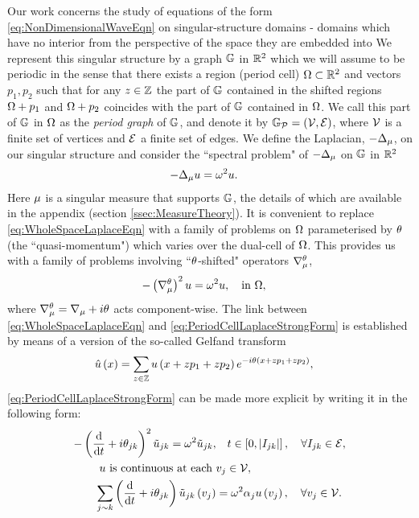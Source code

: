 Our work concerns the study of equations of the form \eqref{eq:NonDimensionalWaveEqn} on singular-structure domains - domains which have no interior from the perspective of the space they are embedded into 
We represent this singular structure by a graph $\mathbb{G}$ in $\mathbb{R}^2$ which we will assume to be periodic in the sense that there exists a region (period cell) $\Omega\subset\mathbb{R}^2$ and vectors $p_1, p_2$ such that for any $z\in\mathbb{Z}$ the part of $\mathbb{G}$ contained in the shifted regions $\Omega+p_1$ and $\Omega+p_2$ coincides with the part of $\mathbb{G}$ contained in $\Omega$.
We call this part of $\mathbb{G}$ in $\Omega$ as the \emph{period graph} of $\mathbb{G}$, and denote it by $\mathbb{G}_{\mathcal{P}}=\left( \mathcal{V}, \mathcal{E} \right)$, where $\mathcal{V}$ is a finite set of vertices and $\mathcal{E}$ a finite set of edges.
We define the Laplacian, $-\Delta_{\mu}$, on our singular structure and consider the ``spectral problem" of $-\Delta_{\mu}$ on $\mathbb{G}$ in $\mathbb{R}^2$
\begin{align} \label{eq:WholeSpaceLaplaceEqn}
	-\Delta_{\mu} u &= \omega^2 u.
\end{align}
Here $\mu$ is a singular measure that supports $\mathbb{G}$, the details of which are available in the appendix (section \ref{ssec:MeasureTheory}).
It is convenient to replace \eqref{eq:WholeSpaceLaplaceEqn} with a family of problems on $\Omega$ parameterised by $\theta$ (the ``quasi-momentum") which varies over the dual-cell of $\Omega$.
This provides us with a family of problems involving ``$\theta$-shifted" operators $\nabla^{\theta}_{\mu}$,
\begin{align} \label{eq:PeriodCellLaplaceStrongForm}
	-\left( \nabla^{\theta}_{\mu} \right)^2 u &= \omega^2 u, \quad\text{in } \Omega,
\end{align}
where $\nabla^{\theta}_{\mu} = \nabla_{\mu} + i\theta$ acts component-wise.
The link between \eqref{eq:WholeSpaceLaplaceEqn} and \eqref{eq:PeriodCellLaplaceStrongForm} is established by means of a version of the so-called Gelfand transform 
\begin{align*}
	\hat{u}\left( x \right) &= \sum_{z\in\mathbb{Z}}u\left( x+zp_1+zp_2 \right)e^{-i\theta\left( x+zp_1+zp_2 \right)},
\end{align*}
\eqref{eq:PeriodCellLaplaceStrongForm} can be made more explicit by writing it in the following form:
\begin{subequations} \label{eq:QGFullSystem}
	\begin{align}
		-\left( \dfrac{\mathrm{d}}{\mathrm{d}t} + i\theta_{jk} \right)^2 \tilde{u}_{jk} = \omega^2 \tilde{u}_{jk}, &\quad t\in\left[ 0,\left\lvert I_{jk} \right\rvert \right], \quad \forall I_{jk}\in \mathcal{E}, \label{eq:QGEdgeODEs} \\
		u \text{ is continuous at each } &v_j \in \mathcal{V}, \label{eq:QGVertCty}\\
		\sum_{j\sim k}\left( \dfrac{\mathrm{d}}{\mathrm{d}t} + i\theta_{jk} \right)\tilde{u}_{jk}\left( v_j \right) &= \omega^2\alpha_{j}u\left( v_j \right), \quad \forall v_j \in \mathcal{V}. \label{eq:QGDerivCondition}
	\end{align}
\end{subequations}
